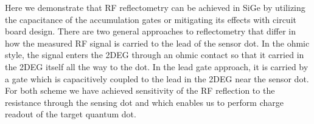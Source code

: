 \documentclass[twocolumn]{article}
\begin{document}
	Here we demonstrate that RF reflectometry can be achieved in SiGe by utilizing the capacitance of the accumulation gates or  mitigating its effects with circuit board design.  There are two general approaches to reflectometry that differ in how the measured RF signal is carried to the lead of the sensor dot.  In the ohmic style, the signal enters the 2DEG through an ohmic contact so that it carried in the 2DEG itself all the way to the dot.  In the lead gate approach, it is carried by a gate which is capacitively coupled to the lead in the 2DEG near the sensor dot. For both scheme we have achieved sensitivity of the RF reflection to the resistance through the sensing dot and which enables us to perform charge readout of the target quantum dot. %
	
%
%
%
%
%
\end{document}
